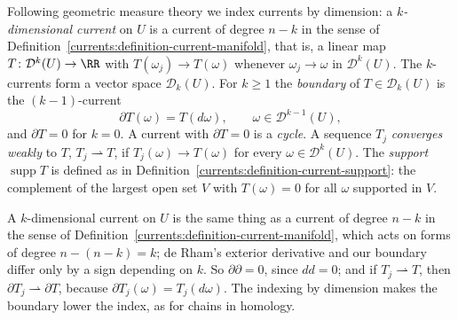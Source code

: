 \begin{definition}\label{currents:definition-current}
Following geometric measure theory we index currents by dimension: a \emph{$k$-dimensional current} on $U$ is a current of degree $n - k$ in the sense of
Definition~\ref{currents:definition-current-manifold}, that is, a linear map $T \colon \mathcal{D}^k(U) \to \RR$ with $T(\omega_j) \to T(\omega)$ whenever $\omega_j \to \omega$ in $\mathcal{D}^k(U)$. The $k$-currents form a vector space
$\mathcal{D}_k(U)$. For $k \geq 1$ the \emph{boundary} of $T \in \mathcal{D}_k(U)$ is the $(k-1)$-current
\[
\partial T(\omega) = T(d\omega), \qquad \omega \in \mathcal{D}^{k-1}(U),
\]
and $\partial T = 0$ for $k = 0$. A current with $\partial T = 0$ is a \emph{cycle}. A sequence $T_j$ \emph{converges weakly} to $T$, $T_j \rightharpoonup T$, if $T_j(\omega) \to T(\omega)$ for every $\omega \in \mathcal{D}^k(U)$.
The \emph{support} $\operatorname{supp}T$ is defined as in Definition~\ref{currents:definition-current-support}: the complement of the largest open set $V$ with $T(\omega) = 0$ for all $\omega$ supported in $V$.
\end{definition}

A $k$-dimensional current on $U$ is the same thing as a current of degree $n - k$ in the sense of Definition~\ref{currents:definition-current-manifold}, which acts on forms of degree $n - (n - k) = k$; de Rham's exterior
derivative and our boundary differ only by a sign depending on $k$. So $\partial\partial = 0$, since $dd = 0$; and if $T_j \rightharpoonup T$, then $\partial T_j \rightharpoonup \partial T$, because
$\partial T_j(\omega) = T_j(d\omega)$. The indexing by dimension makes the boundary lower the index, as for chains in homology.

